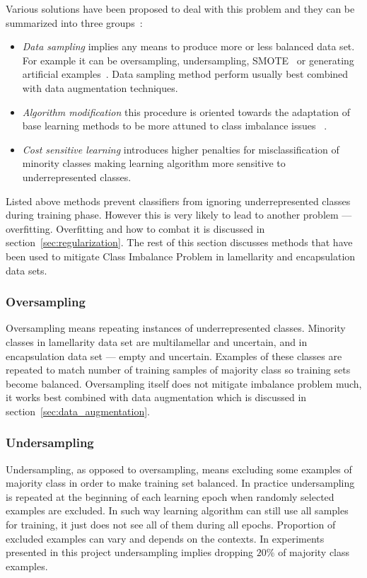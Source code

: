 \documentclass[a4paper, 11pt, table]{article}
\begin{document}
Various solutions have been proposed to deal with this problem and they can be summarized into three groups~\cite{Lopez2013113}:

\begin{itemize}

\item \textit{Data sampling} implies any means to produce more or less balanced data set. For example it can be oversampling, undersampling, SMOTE~\cite{smote_chawla} or generating artificial examples~\cite{ishaq_synthetic}. Data sampling method perform usually best combined with data augmentation techniques.

\item \textit{Algorithm modification} this procedure is oriented towards the adaptation of base learning methods to be more attuned to class imbalance issues ~\cite{Zadrozny:2001:LMD:502512.502540}.

\item \textit{Cost sensitive learning} introduces higher penalties for misclassification of minority classes making learning algorithm more sensitive to underrepresented classes. 

\end{itemize}

Listed above methods prevent classifiers from ignoring underrepresented classes during training phase. However this is very likely to lead to another problem --- overfitting. Overfitting and how to combat it is discussed in section~\ref{sec:regularization}. The rest of this section discusses methods that have been used to mitigate Class Imbalance Problem in lamellarity and encapsulation data sets. 


\subsubsection{Oversampling}
Oversampling means repeating instances of underrepresented classes. Minority classes in lamellarity data set are multilamellar and uncertain, and in encapsulation data set --- empty and uncertain. Examples of these classes are repeated to match number of training samples of majority class so training sets become balanced. Oversampling itself does not mitigate imbalance problem much, it works best combined with data augmentation which is discussed in section~\ref{sec:data_augmentation}.

\subsubsection{Undersampling}
Undersampling, as opposed to oversampling, means excluding some examples of majority class in order to make training set balanced. In practice undersampling is repeated at the beginning of each learning epoch when randomly selected examples are excluded. In such way learning algorithm can still use all samples for training, it just does not see all of them during all epochs. Proportion of excluded examples can vary and depends on the contexts. In experiments presented in this project undersampling implies dropping $20\%$ of majority class examples. 
\end{document}
